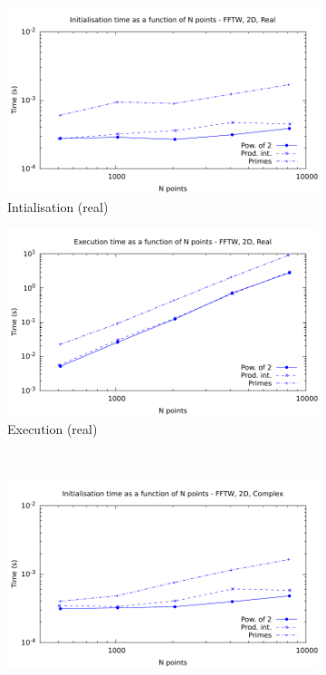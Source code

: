 \documentclass[12pt, a4paper]{article}
\begin{document}
\begin{figure}[H]
\captionsetup{width=0.8\linewidth}
\centering
\begin{subfigure}{.5\textwidth}
\centering
\includegraphics[width=.9\linewidth]{graphs/2d-fftw-init-r.pdf}
\caption{Intialisation (real)}
\label{2DFFTWRI}
\end{subfigure}%
\begin{subfigure}{.5\textwidth}
\centering
\includegraphics[width=.9\linewidth]{graphs/2d-fftw-exec-r.pdf}
\caption{Execution (real)}
\label{2DFFTWR}
\end{subfigure}\\
\begin{subfigure}{.5\textwidth}
\centering
\includegraphics[width=.9\linewidth]{graphs/2d-fftw-init-c.pdf}

\end{subfigure}
\end{figure}
\end{document}
